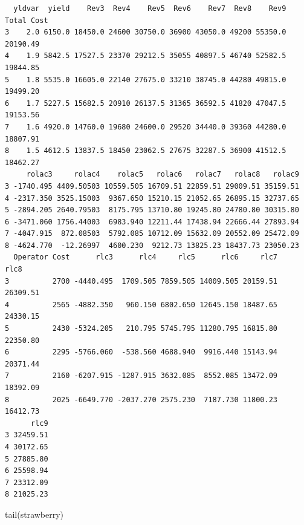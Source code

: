 \documentclass[
  letterpaper,
  DIV=11,
  numbers=noendperiod]{scrartcl}
\newenvironment{Shaded}{\begin{snugshade}}{\end{snugshade}}
\newcommand{\FunctionTok}[1]{\textcolor[rgb]{0.28,0.35,0.67}{#1}}
\newcommand{\NormalTok}[1]{\textcolor[rgb]{0.00,0.23,0.31}{#1}}
\begin{document}
\begin{verbatim}
  yldvar  yield    Rev3  Rev4    Rev5  Rev6    Rev7  Rev8    Rev9 Total Cost
3    2.0 6150.0 18450.0 24600 30750.0 36900 43050.0 49200 55350.0   20190.49
4    1.9 5842.5 17527.5 23370 29212.5 35055 40897.5 46740 52582.5   19844.85
5    1.8 5535.0 16605.0 22140 27675.0 33210 38745.0 44280 49815.0   19499.20
6    1.7 5227.5 15682.5 20910 26137.5 31365 36592.5 41820 47047.5   19153.56
7    1.6 4920.0 14760.0 19680 24600.0 29520 34440.0 39360 44280.0   18807.91
8    1.5 4612.5 13837.5 18450 23062.5 27675 32287.5 36900 41512.5   18462.27
     rolac3     rolac4    rolac5   rolac6   rolac7   rolac8   rolac9
3 -1740.495 4409.50503 10559.505 16709.51 22859.51 29009.51 35159.51
4 -2317.350 3525.15003  9367.650 15210.15 21052.65 26895.15 32737.65
5 -2894.205 2640.79503  8175.795 13710.80 19245.80 24780.80 30315.80
6 -3471.060 1756.44003  6983.940 12211.44 17438.94 22666.44 27893.94
7 -4047.915  872.08503  5792.085 10712.09 15632.09 20552.09 25472.09
8 -4624.770  -12.26997  4600.230  9212.73 13825.23 18437.73 23050.23
  Operator Cost      rlc3      rlc4     rlc5      rlc6     rlc7     rlc8
3          2700 -4440.495  1709.505 7859.505 14009.505 20159.51 26309.51
4          2565 -4882.350   960.150 6802.650 12645.150 18487.65 24330.15
5          2430 -5324.205   210.795 5745.795 11280.795 16815.80 22350.80
6          2295 -5766.060  -538.560 4688.940  9916.440 15143.94 20371.44
7          2160 -6207.915 -1287.915 3632.085  8552.085 13472.09 18392.09
8          2025 -6649.770 -2037.270 2575.230  7187.730 11800.23 16412.73
      rlc9
3 32459.51
4 30172.65
5 27885.80
6 25598.94
7 23312.09
8 21025.23
\end{verbatim}

\begin{Shaded}
\begin{Highlighting}[]
\FunctionTok{tail}\NormalTok{(strawberry)}
\end{Highlighting}
\end{Shaded}
\end{document}
